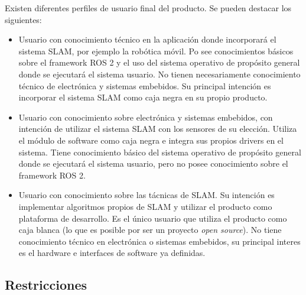\documentclass[12pt,a4paper, twosite]{article}
\begin{document}

Existen diferentes perfiles de usuario final del producto. Se pueden destacar los siguientes:

\begin{itemize}
  \item Usuario con conocimiento técnico en la aplicación donde incorporará el sistema SLAM, por
  ejemplo la robótica móvil. Po see conocimientos básicos sobre el framework ROS 2 y el uso del
  sistema operativo de propósito general donde se ejecutará el sistema usuario. No tienen
  necesariamente conocimiento técnico de electrónica y sistemas embebidos. Su principal intención
  es incorporar el sistema SLAM como caja negra en su propio producto.
  \item Usuario con conocimiento sobre electrónica y sistemas embebidos, con intención de utilizar
  el sistema SLAM con los sensores de su elección. Utiliza el módulo de software como caja negra e
  integra sus propios drivers en el sistema. Tiene conocimiento básico del sistema operativo de
  propósito general donde se ejecutará el sistema usuario, pero no posee conocimiento sobre el
  framework ROS 2.
  \item Usuario con conocimiento sobre las tácnicas de SLAM. Su intención es implementar algoritmos
  propios de SLAM y utilizar el producto como plataforma de desarrollo. Es el único usuario que
  utiliza el producto como caja blanca (lo que es posible por ser un proyecto \textit{open
  source}). No tiene conocimiento técnico en electrónica o sistemas embebidos, su principal interes
  es el hardware e interfaces de software ya definidas.
\end{itemize}

\subsection{Restricciones}
\label{sec:org5ca5790}




\end{document}
